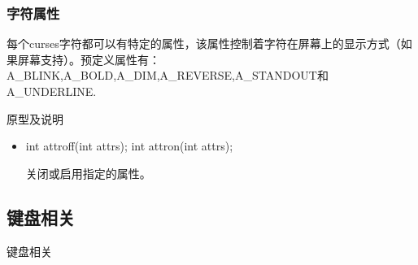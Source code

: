 \documentclass{beamer}
\begin{document}
\begin{frame}
\frametitle{字符属性}
每个curses字符都可以有特定的属性，该属性控制着字符在屏幕上的显示方式（如果屏幕支持）。预定义属性有：A\_BLINK,A\_BOLD,A\_DIM,A\_REVERSE,A\_STANDOUT和A\_UNDERLINE.
\begin{block}{原型及说明}
\begin{itemize}
\item
int attroff(int attrs);
int attron(int attrs);


关闭或启用指定的属性。
\end{itemize}
\end{block}

\end{frame}
\subsection{键盘相关}
\begin{frame}
\Huge{\centerline{键盘相关}}
\end{frame}
\end{document}
